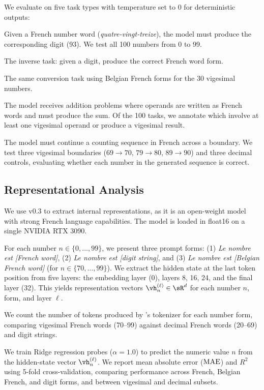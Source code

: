 We evaluate \gptmodel on five task types with temperature set to 0 for deterministic outputs:

Given a French number word (\eg \emph{quatre-vingt-treize}), the model must produce the corresponding digit (93).
We test all 100 numbers from 0 to 99.

The inverse task: given a digit, produce the correct French word form.

The same conversion task using Belgian French forms for the 30 vigesimal numbers.

The model receives addition problems where operands are written as French words and must produce the sum.
Of the 100 tasks, we annotate which involve at least one vigesimal operand or produce a vigesimal result.

The model must continue a counting sequence in French across a boundary.
We test three vigesimal boundaries ($69 \to 70$, $79 \to 80$, $89 \to 90$) and three decimal controls, evaluating whether each number in the generated sequence is correct.

\subsection{Representational Analysis}
\label{sec:repr}

We use \mistral v0.3 to extract internal representations, as it is an open-weight model with strong French language capabilities.
The model is loaded in float16 on a single NVIDIA RTX 3090.

For each number $n \in \{0, \ldots, 99\}$, we present three prompt forms:
(1) \emph{Le nombre est [French word]},
(2) \emph{Le nombre est [digit string]}, and
(3) \emph{Le nombre est [Belgian French word]} (for $n \in \{70, \ldots, 99\}$).
We extract the hidden state at the last token position from five layers: the embedding layer (0), layers 8, 16, 24, and the final layer (32).
This yields representation vectors $\vh_n^{(\ell)} \in \sR^{d}$ for each number $n$, form, and layer $\ell$.

We count the number of tokens produced by \mistral's tokenizer for each number form, comparing vigesimal French words (70--99) against decimal French words (20--69) and digit strings.

We train Ridge regression probes ($\alpha = 1.0$) to predict the numeric value $n$ from the hidden-state vector $\vh_n^{(\ell)}$.
We report mean absolute error ($\text{MAE}$) and $R^2$ using 5-fold cross-validation, comparing performance across French, Belgian French, and digit forms, and between vigesimal and decimal subsets.

